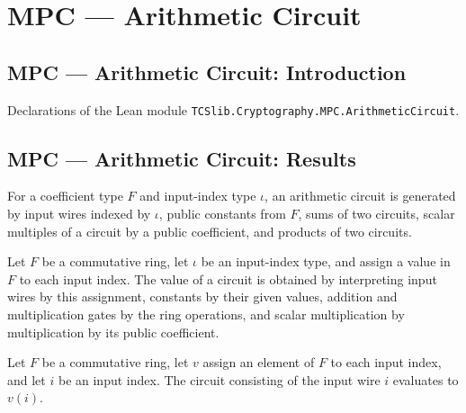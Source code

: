 \section{MPC --- Arithmetic Circuit}
\subsection*{MPC --- Arithmetic Circuit: Introduction}

Declarations of the Lean module \texttt{TCSlib.Cryptography.MPC.ArithmeticCircuit}.

\subsection*{MPC --- Arithmetic Circuit: Results}

\begin{definition}
\label{TCSlib.MPC.Circuit}
\leanok
For a coefficient type $F$ and input-index type $\iota$, an arithmetic circuit is
generated by input wires indexed by $\iota$, public constants from $F$, sums of two
circuits, scalar multiples of a circuit by a public coefficient, and products of two
circuits.
\end{definition}

\begin{definition}
\label{TCSlib.MPC.Circuit.eval}
\leanok
{}
Let $F$ be a commutative ring, let $\iota$ be an input-index type, and assign a value in
$F$ to each input index. The value of a circuit is obtained by interpreting input wires
by this assignment, constants by their given values, addition and multiplication gates
by the ring operations, and scalar multiplication by multiplication by its public
coefficient.
\end{definition}

\begin{theorem}
\label{TCSlib.MPC.Circuit.eval_input}
\leanok
{}
Let $F$ be a commutative ring, let $v$ assign an element of $F$ to each input index, and
let $i$ be an input index. The circuit consisting of the input wire $i$ evaluates to
$v(i)$.
\end{theorem}

